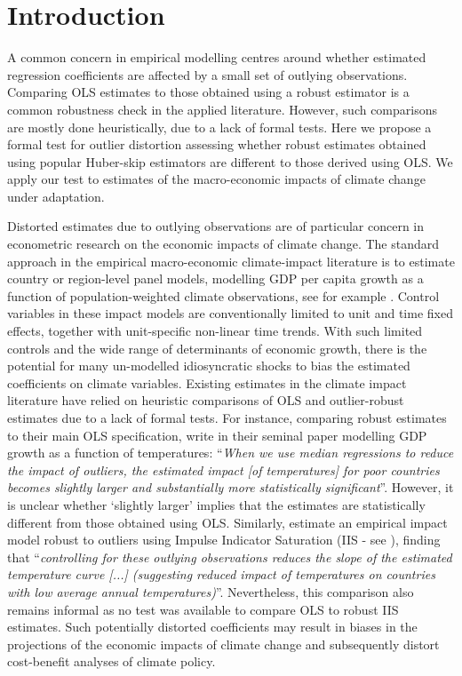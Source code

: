 \documentclass[11pt, letterpaper]{article}
\numberwithin{algorithm}{section}
\numberwithin{assumption}{section}
\numberwithin{lemma}{section}
\numberwithin{theorem}{section}
\numberwithin{corollary}{section}
\numberwithin{remark}{section}
\numberwithin{equation}{section}
\numberwithin{figure}{section}
\numberwithin{table}{section}
\begin{document}
\newpage
\section{Introduction}
A common concern in empirical modelling centres around whether estimated regression coefficients are affected by a small set of outlying observations. Comparing OLS estimates to those obtained using a robust estimator is a common robustness check in the applied literature. However, such comparisons are mostly done heuristically, due to a lack of formal tests. Here we propose a formal test for outlier distortion assessing whether robust estimates obtained using popular Huber-skip estimators are different to those derived using OLS. We apply our test to estimates of the macro-economic impacts of climate change under adaptation.

Distorted estimates due to outlying observations are of particular concern in econometric research on the economic impacts of climate change. The standard approach in the empirical macro-economic climate-impact literature is to estimate country or region-level panel models, modelling GDP per capita growth as a function of population-weighted climate observations, see for example \citet{dell2012temperature,burke2015global,pretis2018uncertain,kalkuhl2020impact,newell2021gdp}. Control variables in these impact models are conventionally limited to unit and time fixed effects, together with unit-specific non-linear time trends. With such limited controls and the wide range of determinants of economic growth, there is the potential for many un-modelled idiosyncratic shocks to bias the estimated coefficients on climate variables. Existing estimates in the climate impact literature have relied on heuristic comparisons of OLS and outlier-robust estimates due to a lack of formal tests. For instance, comparing robust estimates to their main OLS specification, \cite{dell2012temperature} write in their seminal paper modelling GDP growth as a function of temperatures: ``\emph{When we use median regressions to reduce the impact of outliers, the estimated impact [of temperatures] for poor countries becomes slightly larger and substantially more statistically significant}''. However, it is unclear whether `slightly larger' implies that the estimates are statistically different from those obtained using OLS. Similarly, \cite{pretis2018uncertain} estimate an empirical impact model robust to outliers using Impulse Indicator Saturation (IIS - see \citealt{hendry2008automatic}), finding that ``\emph{controlling for these outlying observations reduces the slope of the estimated temperature curve [...] (suggesting reduced impact of temperatures on countries with low average annual temperatures)}''. Nevertheless, this comparison also remains informal as no test was available to compare OLS to robust IIS estimates. Such potentially distorted coefficients may result in biases in the projections of the economic impacts of climate change and subsequently distort cost-benefit analyses of climate policy.
\end{document}
